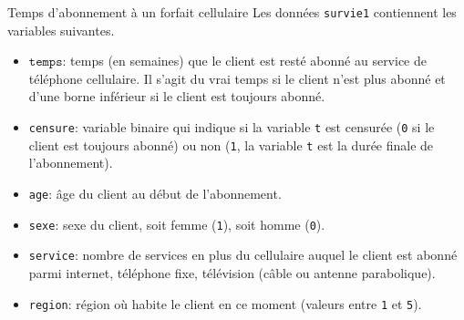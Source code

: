 \documentclass[
  ignorenonframetext,
]{beamer}
\providecommand{\tightlist}{%
  \setlength{\itemsep}{0pt}\setlength{\parskip}{0pt}}\usepackage{longtable,booktabs,array}
\begin{document}
\begin{frame}[fragile]{Temps d'abonnement à un forfait cellulaire}
\protect\hypertarget{temps-dabonnement-uxe0-un-forfait-cellulaire}{}
Les données \texttt{survie1} contiennent les variables suivantes.

\begin{itemize}
\tightlist
\item
  \(\texttt{temps}\): temps (en semaines) que le client est resté abonné
  au service de téléphone cellulaire. Il s'agit du vrai temps si le
  client n'est plus abonné et d'une borne inférieur si le client est
  toujours abonné.
\item
  \texttt{censure}: variable binaire qui indique si la variable
  \texttt{t} est censurée (\texttt{0} si le client est toujours abonné)
  ou non (\texttt{1}, la variable \texttt{t} est la durée finale de
  l'abonnement).
\item
  \texttt{age}: âge du client au début de l'abonnement.
\item
  \texttt{sexe}: sexe du client, soit femme (\texttt{1}), soit homme
  (\texttt{0}).
\item
  \texttt{service}: nombre de services en plus du cellulaire auquel le
  client est abonné parmi internet, téléphone fixe, télévision (câble ou
  antenne parabolique).
\item
  \texttt{region}: région où habite le client en ce moment (valeurs
  entre \texttt{1} et \texttt{5}).
\end{itemize}
\end{frame}
\end{document}
